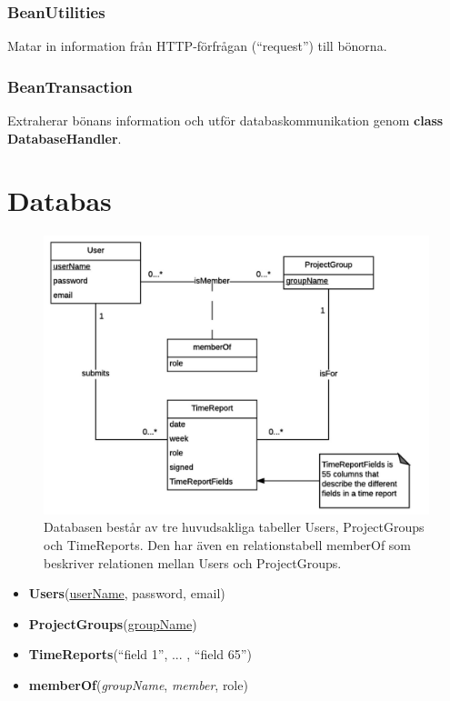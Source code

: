 \documentclass[paper=a4, fontsize=11pt,twoside]{article}
\begin{document}
\subsubsection{BeanUtilities}
Matar in information från HTTP-förfrågan (“request”) till bönorna.

\subsubsection{BeanTransaction}
Extraherar bönans information och utför databaskommunikation genom \textbf{class DatabaseHandler}.

\section{Databas}
\begin{figure}[H]
\centering
\caption{Databasen består av tre huvudsakliga tabeller Users, ProjectGroups och TimeReports. Den har även en relationstabell memberOf som beskriver relationen mellan Users och ProjectGroups.}
\includegraphics{ERmodel}
\end{figure}

\begin{itemize}
\item[] \textbf{Users}(\underline{userName}, password, email)
\item[] \textbf{ProjectGroups}(\underline{groupName})
\item[] \textbf{TimeReports}(``field 1'', ... , ``field 65'')
\item[] \textbf{memberOf}(\textit{groupName}, \textit{member}, role)
\end{itemize}
\end{document}

